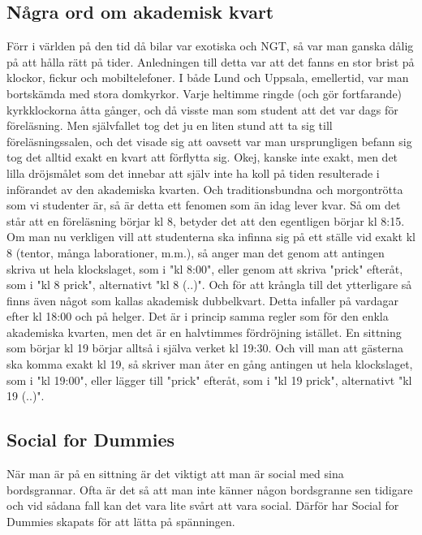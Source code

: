 
\newpage

\enlargethispage{1.0cm}
\subsection*{Några ord om akademisk kvart}

{\fontsize{9}{9}\selectfont 
Förr i världen på den tid då bilar var exotiska och NGT, 
så var man ganska dålig på att hålla rätt på tider. 
Anledningen till detta var att det fanns en stor brist på klockor, fickur och mobiltelefoner. 
I både Lund och Uppsala, emellertid, var man bortskämda med stora domkyrkor. 
Varje heltimme ringde (och gör fortfarande) kyrkklockorna åtta gånger, 
och då visste man som student att det var dags för föreläsning. 
Men självfallet tog det ju en liten stund att ta sig till föreläsningssalen, 
och det visade sig att oavsett var man ursprungligen befann sig tog det alltid exakt en kvart att förflytta sig. 
Okej, kanske inte exakt, men det lilla dröjsmålet som det innebar att själv inte ha koll på tiden resulterade i införandet av den akademiska kvarten.
Och traditionsbundna och morgontrötta som vi studenter är, 
så är detta ett fenomen som än idag lever kvar. Så om det står att en föreläsning börjar kl 8, 
betyder det att den egentligen börjar kl 8:15. 
Om man nu verkligen vill att studenterna ska infinna sig på ett ställe vid exakt kl 8 
(tentor, många laborationer, m.m.), så anger man det genom att antingen skriva ut hela klockslaget, 
som i "kl 8:00", eller genom att skriva "prick" efteråt, som i "kl 8 prick", alternativt "kl 8 (..)". 
Och för att krångla till det ytterligare så finns även något som kallas akademisk dubbelkvart. 
Detta infaller på vardagar efter kl 18:00 och på helger. 
Det är i princip samma regler som för den enkla akademiska kvarten, 
men det är en halvtimmes fördröjning istället. 
En sittning som börjar kl 19 börjar alltså i själva verket kl 19:30. 
Och vill man att gästerna ska komma exakt kl 19, 
så skriver man åter en gång antingen ut hela klockslaget, 
som i "kl 19:00", eller lägger till "prick" efteråt, som i "kl 19 prick", alternativt "kl 19 (..)".
}

\newpage


\subsection*{Social for Dummies}
När man är på en sittning är det viktigt att man är social med sina bordsgrannar. 
Ofta är det så att man inte känner någon bordsgranne sen tidigare och vid sådana 
fall kan det vara lite svårt att vara social. Därför har Social for Dummies 
skapats för att lätta på spänningen.
\\

